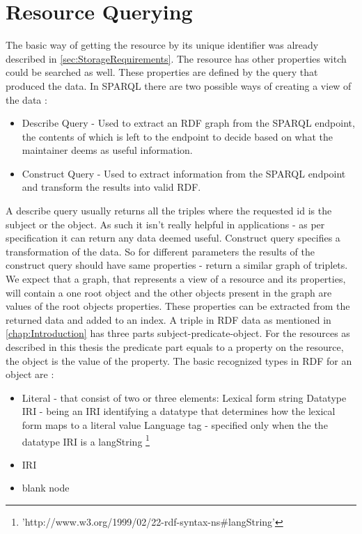 \section{Resource Querying}
\label{sec:ResourceQuerying}
The basic way of getting the resource by its unique identifier was already described in \autoref{sec:StorageRequirements}. The resource has other properties witch could be searched as well. These properties are defined by the query that produced the data. In SPARQL there are two possible ways of creating a view of the data \cite{onlineSparqlQueryLanguageSpec}:
\begin{itemize}
	\item Describe Query - Used to extract an RDF graph from the SPARQL endpoint, the contents of which is left to the endpoint to decide based on what the maintainer deems as useful information.
	\item Construct Query - Used to extract information from the SPARQL endpoint and transform the results into valid RDF.
\end{itemize}
A describe query usually returns all the triples where the requested id is the subject or the object. As such it isn't really helpful in applications - as per specification it can return any data deemed useful.
Construct query specifies a transformation of the data. So for different parameters the results of the construct query should have same properties - return a similar graph of triplets. We expect that a graph, that represents a view of a resource and its properties, will contain a one root object and the other objects present in the graph are values of the root objects properties.
These properties can be extracted from the returned data and added to an index. A triple in RDF data as mentioned in \autoref{chap:Introduction} has three parts subject-predicate-object. For the resources as described in this thesis the predicate part equals to a property on the resource, the object is the value of the property. The basic recognized types in RDF for an object are \cite{onlineRdfConcepts}:
\begin{itemize}
	\item Literal - that consist of two or three elements: %
		\subitem Lexical form string
		\subitem Datatype IRI - being an IRI identifying a datatype that determines how the lexical form maps to a literal value
		\subitem Language tag - specified only when the the datatype IRI is a langString \footnote{'http://www.w3.org/1999/02/22-rdf-syntax-ns\#langString'}
	\item IRI
	\item blank node
\end{itemize}
